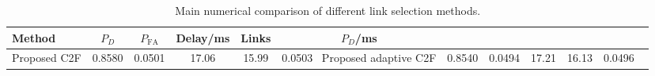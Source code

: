 \begin{table}[t]
    \centering
    \caption{Main numerical comparison of different link selection methods.}
    \label{tab:main_summary}
    \begin{tabular}{l c c c c c}
        \hline
        Method & $P_D$ & $P_{\mathrm{FA}}$ & Delay/ms & Links & $P_D$/ms \\
        \hline
        Proposed C2F & 0.8580 & 0.0501 & 17.06 & 15.99 & 0.0503 \
        Proposed adaptive C2F & 0.8540 & 0.0494 & 17.21 & 16.13 & 0.0496 \
        \hline
    \end{tabular}
\end{table}
